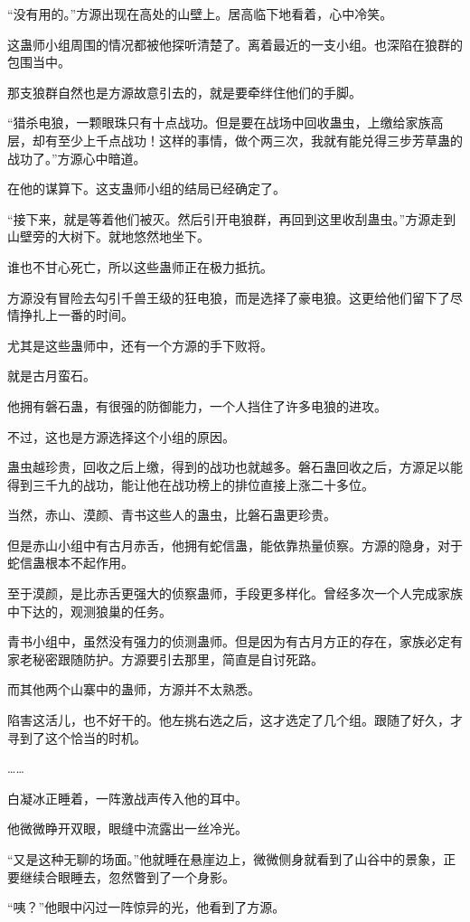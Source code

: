 \begin{this_body}
“没有用的。”方源出现在高处的山壁上。居高临下地看着，心中冷笑。

这蛊师小组周围的情况都被他探听清楚了。离着最近的一支小组。也深陷在狼群的包围当中。

那支狼群自然也是方源故意引去的，就是要牵绊住他们的手脚。

“猎杀电狼，一颗眼珠只有十点战功。但是要在战场中回收蛊虫，上缴给家族高层，却有至少上千点战功！这样的事情，做个两三次，我就有能兑得三步芳草蛊的战功了。”方源心中暗道。

在他的谋算下。这支蛊师小组的结局已经确定了。

“接下来，就是等着他们被灭。然后引开电狼群，再回到这里收刮蛊虫。”方源走到山壁旁的大树下。就地悠然地坐下。

谁也不甘心死亡，所以这些蛊师正在极力抵抗。

方源没有冒险去勾引千兽王级的狂电狼，而是选择了豪电狼。这更给他们留下了尽情挣扎上一番的时间。

尤其是这些蛊师中，还有一个方源的手下败将。

就是古月蛮石。

他拥有磐石蛊，有很强的防御能力，一个人挡住了许多电狼的进攻。

不过，这也是方源选择这个小组的原因。

蛊虫越珍贵，回收之后上缴，得到的战功也就越多。磐石蛊回收之后，方源足以能得到三千九的战功，能让他在战功榜上的排位直接上涨二十多位。

当然，赤山、漠颜、青书这些人的蛊虫，比磐石蛊更珍贵。

但是赤山小组中有古月赤舌，他拥有蛇信蛊，能依靠热量侦察。方源的隐身，对于蛇信蛊根本不起作用。

至于漠颜，是比赤舌更强大的侦察蛊师，手段更多样化。曾经多次一个人完成家族中下达的，观测狼巢的任务。

青书小组中，虽然没有强力的侦测蛊师。但是因为有古月方正的存在，家族必定有家老秘密跟随防护。方源要引去那里，简直是自讨死路。

而其他两个山寨中的蛊师，方源并不太熟悉。

陷害这活儿，也不好干的。他左挑右选之后，这才选定了几个组。跟随了好久，才寻到了这个恰当的时机。

……

白凝冰正睡着，一阵激战声传入他的耳中。

他微微睁开双眼，眼缝中流露出一丝冷光。

“又是这种无聊的场面。”他就睡在悬崖边上，微微侧身就看到了山谷中的景象，正要继续合眼睡去，忽然瞥到了一个身影。

“咦？”他眼中闪过一阵惊异的光，他看到了方源。


\end{this_body}
